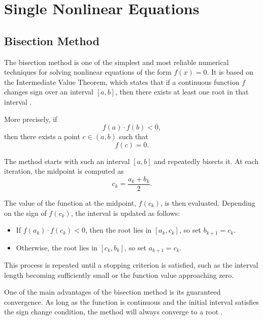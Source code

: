 \chapter{Single Nonlinear Equations}

\section{Bisection Method}

The bisection method is one of the simplest and most reliable numerical techniques for solving nonlinear equations of the form \( f(x) = 0 \). It is based on the Intermediate Value Theorem, which states that if a continuous function \( f \) changes sign over an interval \([a, b]\), then there exists at least one root in that interval \cite{burden, atkinson}.

More precisely, if
\begin{equation}
f(a) \cdot f(b) < 0,
\end{equation}
then there exists a point \( c \in (a, b) \) such that
\begin{equation}
f(c) = 0.
\end{equation}

The method starts with such an interval \([a, b]\) and repeatedly bisects it. At each iteration, the midpoint is computed as
\begin{equation}
c_k = \frac{a_k + b_k}{2}.
\end{equation}

The value of the function at the midpoint, \( f(c_k) \), is then evaluated. Depending on the sign of \( f(c_k) \), the interval is updated as follows:

\begin{itemize}
    \item If \( f(a_k) \cdot f(c_k) < 0 \), then the root lies in \([a_k, c_k]\), so set \( b_{k+1} = c_k \).
    \item Otherwise, the root lies in \([c_k, b_k]\), so set \( a_{k+1} = c_k \).
\end{itemize}

This process is repeated until a stopping criterion is satisfied, such as the interval length becoming sufficiently small or the function value approaching zero.

One of the main advantages of the bisection method is its guaranteed convergence. As long as the function is continuous and the initial interval satisfies the sign change condition, the method will always converge to a root \cite{burden}.

